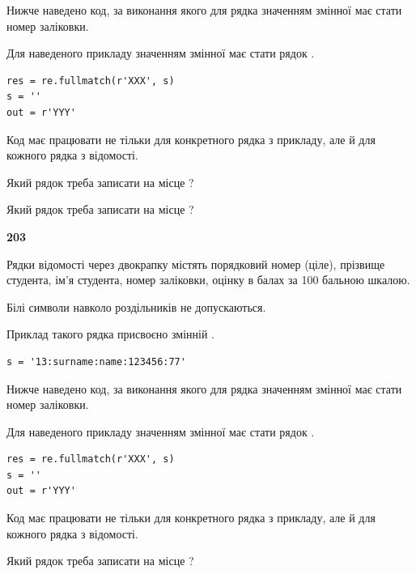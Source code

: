Нижче наведено код, за виконання якого для рядка  значенням змінної  має стати номер заліковки.

Для наведеного прикладу значенням змінної  має стати рядок  .



\begin{verbatim}
res = re.fullmatch(r'XXX', s)
s = ''
out = r'YYY'
\end{verbatim}


Код має працювати не тільки для конкретного рядка з прикладу, але й для кожного рядка з відомості.




Який рядок треба записати на місце  ?\par
\vspace{5mm}


Який рядок треба записати на місце  ?\par


\newpage

{\begin {center}\textbf{ 203}\end {center}}\par
Рядки відомості через двокрапку містять порядковий номер (ціле), пріз\-ви\-ще студен\-та, ім'я студента, номер заліковки, оцінку в балах за 100 бальною шкалою.

Білі символи навколо роздільників не допускаються.

Приклад такого рядка присвоєно змінній .



\begin{verbatim}
s = '13:surname:name:123456:77'
\end{verbatim}


Нижче наведено код, за виконання якого для рядка  значенням змінної  має стати номер заліковки.

Для наведеного прикладу значенням змінної  має стати рядок  .



\begin{verbatim}
res = re.fullmatch(r'XXX', s)
s = ''
out = r'YYY'
\end{verbatim}


Код має працювати не тільки для конкретного рядка з прикладу, але й для кожного рядка з відомості.




Який рядок треба записати на місце  ?\par
\vspace{5mm}


